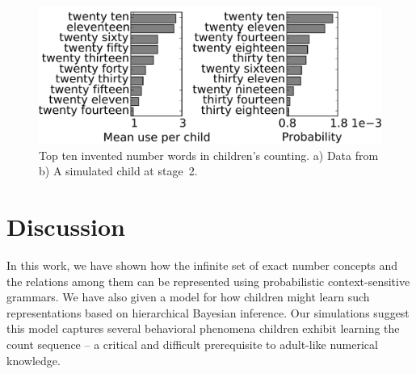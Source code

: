 \documentclass[10pt,letterpaper]{article}
\begin{document}




\begin{figure}[t]
\includegraphics[width=0.9\linewidth]{figures/inventedWordComparison3}
\caption{Top ten invented number words in children's counting. a) Data
  from \citeauthor{FusRicBriar1982} b) A simulated child at stage~2.
   \label{fig:inventedWordComparison}}
\end{figure}


\section{Discussion}

In this work, we have shown how the infinite set of exact number
concepts and the relations among them can be represented using
probabilistic context-sensitive grammars. We have also given a model
for how children might learn such representations based on
hierarchical Bayesian inference. Our simulations suggest this model
captures several behavioral phenomena children exhibit learning the count
sequence -- a critical and difficult prerequisite to adult-like
numerical knowledge.
\end{document}
